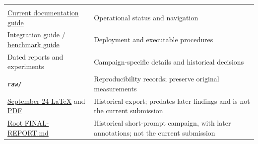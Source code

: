\documentclass[10pt,a4paper]{article}
\begin{document}
\begin{longtable}[]{@{}ll@{}}
\begin{minipage}[t]{0.47\columnwidth}
\end{minipage}\tabularnewline
\begin{minipage}[t]{0.47\columnwidth}\raggedright
\href{https://github.com/MoyaMryia/riscv-accl/blob/main/spacemit/DOCS.md}{Current
documentation guide}\strut
\end{minipage} & \begin{minipage}[t]{0.47\columnwidth}\raggedright
Operational status and navigation\strut
\end{minipage}\tabularnewline
\begin{minipage}[t]{0.47\columnwidth}\raggedright
\href{https://github.com/MoyaMryia/riscv-accl/blob/main/spacemit/README.md}{Integration
guide} /
\href{https://github.com/MoyaMryia/riscv-accl/blob/main/spacemit/bench/README.md}{benchmark
guide}\strut
\end{minipage} & \begin{minipage}[t]{0.47\columnwidth}\raggedright
Deployment and executable procedures\strut
\end{minipage}\tabularnewline
\begin{minipage}[t]{0.47\columnwidth}\raggedright
Dated reports and experiments\strut
\end{minipage} & \begin{minipage}[t]{0.47\columnwidth}\raggedright
Campaign-specific details and historical decisions\strut
\end{minipage}\tabularnewline
\begin{minipage}[t]{0.47\columnwidth}\raggedright
\nolinkurl{raw/}\strut
\end{minipage} & \begin{minipage}[t]{0.47\columnwidth}\raggedright
Reproducibility records; preserve original measurements\strut
\end{minipage}\tabularnewline
\begin{minipage}[t]{0.47\columnwidth}\raggedright
\href{https://github.com/MoyaMryia/riscv-accl/blob/main/spacemit/reports/k1-llm-inference-optimizations.tex}{September
24 LaTeX} and
\href{https://github.com/MoyaMryia/riscv-accl/blob/main/spacemit/reports/k1-llm-inference-optimizations.pdf}{PDF}\strut
\end{minipage} & \begin{minipage}[t]{0.47\columnwidth}\raggedright
Historical export; predates later findings and is not the current
submission\strut
\end{minipage}\tabularnewline
\begin{minipage}[t]{0.47\columnwidth}\raggedright
\href{https://github.com/MoyaMryia/riscv-accl/blob/main/FINAL-REPORT.md}{Root
FINAL-REPORT.md}\strut
\end{minipage} & \begin{minipage}[t]{0.47\columnwidth}\raggedright
Historical short-prompt campaign, with later annotations; not the
current submission\strut
\end{minipage}\tabularnewline
\bottomrule
\end{longtable}
\end{document}
